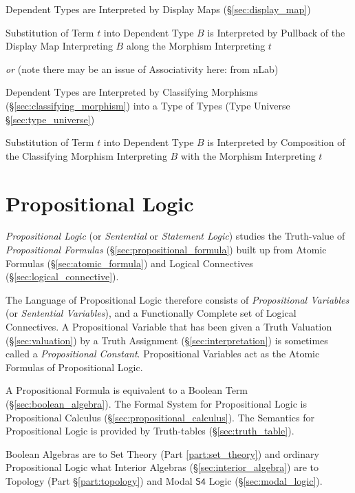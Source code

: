 Dependent Types are Interpreted by Display Maps
(\S\ref{sec:display_map})

Substitution of Term $t$ into Dependent Type $B$ is Interpreted by
Pullback of the Display Map Interpreting $B$ along the Morphism
Interpreting $t$

\emph{or} (note there may be an issue of Associativity here: from nLab)

Dependent Types are Interpreted by Classifying Morphisms
(\S\ref{sec:classifying_morphism}) into a Type of Types (Type Universe
\S\ref{sec:type_universe})

Substitution of Term $t$ into Dependent Type $B$ is Interpreted by
Composition of the Classifying Morphism Interpreting $B$ with the
Morphism Interpreting $t$



\section{Propositional Logic}\label{sec:propositional_logic}

\emph{Propositional Logic} (or \emph{Sentential} or \emph{Statement
  Logic}) studies the Truth-value of \emph{Propositional Formulas}
(\S\ref{sec:propositional_formula}) built up from Atomic Formulas
(\S\ref{sec:atomic_formula}) and Logical Connectives
(\S\ref{sec:logical_connective}).

The Language of Propositional Logic therefore consists of
\emph{Propositional Variables} (or \emph{Sentential Variables}), and a
Functionally Complete set of Logical Connectives. A Propositional
Variable that has been given a Truth Valuation (\S\ref{sec:valuation})
by a Truth Assignment (\S\ref{sec:interpretation}) is sometimes called
a \emph{Propositional Constant}. Propositional Variables act as the
Atomic Formulas of Propositional Logic.

A Propositional Formula is equivalent to a Boolean Term
(\S\ref{sec:boolean_algebra}). The Formal System for Propositional
Logic is Propositional Calculus (\S\ref{sec:propositional_calculus}).
The Semantics for Propositional Logic is provided by Truth-tables
(\S\ref{sec:truth_table}).

Boolean Algebras are to Set Theory (Part \ref{part:set_theory}) and ordinary
Propositional Logic what Interior Algebras (\S\ref{sec:interior_algebra}) are to
Topology (Part \S\ref{part:topology}) and Modal $\mathsf{S4}$ Logic
(\S\ref{sec:modal_logic}).

